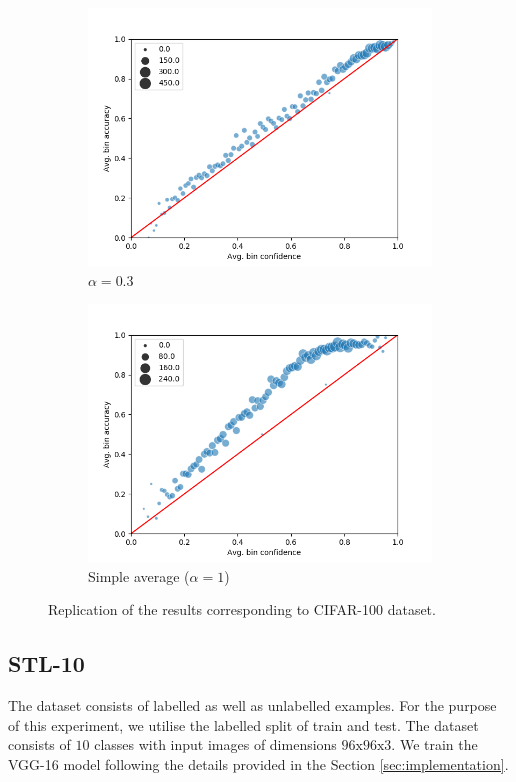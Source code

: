 \documentclass{article}
\begin{document}
\begin{figure}[h]
\begin{subfigure}[b]{0.31\textwidth}
         \centering
         \noindent\includegraphics[width=\textwidth]{images/cifar/scatterplot_0_3.png}
         \caption{$\alpha=0.3$}
     \end{subfigure}
     \begin{subfigure}[b]{0.31\textwidth}
         \centering
         \noindent\includegraphics[width=\textwidth]{images/cifar/scatterplot_1.png}
         \caption{Simple average ($\alpha=1$)}
     \end{subfigure}
        \caption{Replication of the results corresponding to CIFAR-100 dataset.}
        \label{fig:cifar100}
\end{figure}

\subsection{STL-10}
The dataset consists of labelled as well as unlabelled examples. For the purpose of this experiment, we utilise the labelled split of train and test. The dataset consists of $10$ classes with input images of dimensions $96\text{x}96\text{x}3$. We train the VGG-16 model following the details provided in the Section \ref{sec:implementation}.
\end{document}

